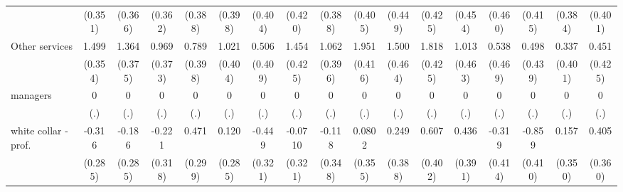 {\begin{tabular}{l*{16}{c}}
                    &     (0.351)         &     (0.366)         &     (0.362)         &     (0.388)         &     (0.398)         &     (0.404)         &     (0.420)         &     (0.388)         &     (0.405)         &     (0.449)         &     (0.425)         &     (0.454)         &     (0.460)         &     (0.415)         &     (0.384)         &     (0.401)         \\
[1em]
Other services      &       1.499\sym{***}&       1.364\sym{***}&       0.969\sym{**} &       0.789\sym{*}  &       1.021\sym{*}  &       0.506         &       1.454\sym{***}&       1.062\sym{**} &       1.951\sym{***}&       1.500\sym{**} &       1.818\sym{***}&       1.013\sym{*}  &       0.538         &       0.498         &       0.337         &       0.451         \\
                    &     (0.354)         &     (0.375)         &     (0.373)         &     (0.398)         &     (0.404)         &     (0.409)         &     (0.425)         &     (0.396)         &     (0.416)         &     (0.464)         &     (0.425)         &     (0.463)         &     (0.469)         &     (0.439)         &     (0.401)         &     (0.425)         \\
[1em]
managers            &           0         &           0         &           0         &           0         &           0         &           0         &           0         &           0         &           0         &           0         &           0         &           0         &           0         &           0         &           0         &           0         \\
                    &         (.)         &         (.)         &         (.)         &         (.)         &         (.)         &         (.)         &         (.)         &         (.)         &         (.)         &         (.)         &         (.)         &         (.)         &         (.)         &         (.)         &         (.)         &         (.)         \\
[1em]
white collar - prof.&      -0.316         &      -0.186         &      -0.221         &       0.471         &       0.120         &      -0.449         &     -0.0710         &      -0.118         &      0.0802         &       0.249         &       0.607         &       0.436         &      -0.319         &      -0.859\sym{*}  &       0.157         &       0.405         \\
                    &     (0.285)         &     (0.285)         &     (0.318)         &     (0.299)         &     (0.285)         &     (0.321)         &     (0.321)         &     (0.348)         &     (0.355)         &     (0.388)         &     (0.402)         &     (0.391)         &     (0.414)         &     (0.410)         &     (0.350)         &     (0.360)         \\

\end{tabular}}
